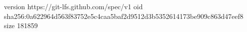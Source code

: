 version https://git-lfs.github.com/spec/v1
oid sha256:0a622964d563f83752e5c4caa5baf2d9512d3b5352614173be909c863d47eef8
size 181859
